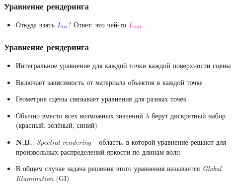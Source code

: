 \documentclass[10pt]{beamer}
\begin{document}
\begin{frame}[fragile]
\frametitle{Уравнение рендеринга}
\begin{itemize}
\item Откуда взять \begin{math}{\color{blue}L_{in}}\end{math}? \pause Ответ: это чей-то \begin{math}{\color{magenta}L_{out}}\end{math} 
\end{itemize}
\begin{center}
\end{center}
\end{frame}

\begin{frame}[fragile]
\frametitle{Уравнение рендеринга}
\begin{itemize}
\item Интегральное уравнение для каждой точки каждой поверхности сцены
\pause
\item Включает зависимость от материала объектов в каждой точке
\pause
\item Геометрия сцены связывает уравнения для разных точек
\pause
\item Обычно вместо всех возможных значений \begin{math}\lambda\end{math} берут дискретный набор ({\color{red}красный}, {\color{green}зелёный}, {\color{blue}синий})
\pause
\item \textbf{\alert{N.B.}}: \textit{Spectral rendering} -- область, в которой уравнение решают для произвольных распределений яркости по длинам волн
\pause
\item В общем случае задача решения этого уравнения называется \textit{Global Illumination} (GI)
\end{itemize}
\end{frame}
\end{document}
